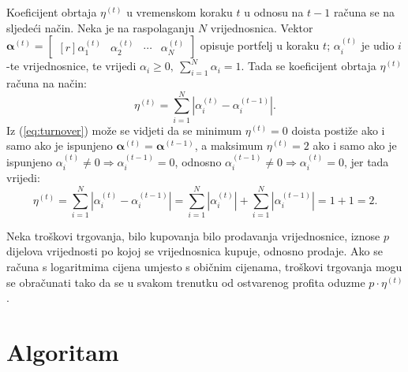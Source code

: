 \documentclass[lmodern, utf8, diplomski, numeric]{fer}
\newcommand{\matr}[1]{\mathbold{#1}}
\newcommand{\q}{\left}
\newcommand{\w}{\right}
\begin{document}
  Koeficijent obrtaja $\eta^{(t)}$ u vremenskom koraku $t$ u odnosu na $t-1$ računa se na sljedeći način.
  Neka je na raspolaganju $N$ vrijednosnica.
  Vektor $\matr{\alpha}^{(t)} = \begin{bmatrix*}[r] \alpha_1^{(t)} & \alpha_2^{(t)} & \cdots & \alpha_N^{(t)} \end{bmatrix*}$ opisuje portfelj u koraku $t$; $\alpha_i^{(t)}$ je udio $i$-te vrijednosnice, te vrijedi $\alpha_i \ge 0,\ \sum_{i=1}^{N} \alpha_i = 1$.
  Tada se koeficijent obrtaja $\eta^{(t)}$ računa na način:
  \begin{equation}
  \label{eq:turnover}
  \eta^{(t)} = \sum_{i=1}^{N} \q \lvert \alpha_i^{(t)} - \alpha_i^{(t-1)} \w \rvert.
  \end{equation}
  Iz (\ref{eq:turnover}) može se vidjeti da se minimum $\eta^{(t)} = 0$ doista postiže ako i samo ako je ispunjeno $\matr{\alpha}^{(t)} = \matr{\alpha}^{(t-1)}$,
  a maksimum $\eta^{(t)} = 2$ ako i samo ako je ispunjeno $\alpha_i^{(t)} \ne 0 \Rightarrow \alpha_i^{(t - 1)} = 0$, odnosno $\alpha_i^{(t - 1)} \ne 0 \Rightarrow \alpha_i^{(t)} = 0$, jer tada vrijedi: 
  \begin{equation*}
  \eta^{(t)} = \sum_{i=1}^{N} \q \lvert \alpha_i^{(t)} - \alpha_i^{(t-1)} \w \rvert = \sum_{i=1}^{N} \q \lvert \alpha_i^{(t)}\w \rvert + \sum_{i=1}^N \q \lvert\alpha_i^{(t-1)} \w \rvert = 1 + 1 = 2.
  \end{equation*}
  
  Neka troškovi trgovanja, bilo kupovanja bilo prodavanja vrijednosnice, iznose $p$ dijelova vrijednosti po kojoj se vrijednosnica kupuje, odnosno prodaje.
  Ako se računa s logaritmima cijena umjesto s običnim cijenama, troškovi trgovanja mogu se obračunati tako da se u svakom trenutku od ostvarenog profita oduzme $p \cdot \eta^{(t)}$.
  
%  
  
\chapter{Algoritam}
\end{document}
